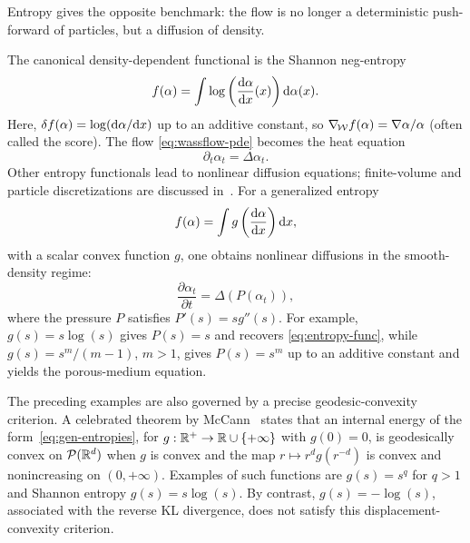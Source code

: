 Entropy gives the opposite benchmark: the flow is no longer a deterministic push-forward of particles, but a diffusion of density.

\begin{example}
The canonical density-dependent functional is the Shannon neg-entropy
   \begin{equation}
       f(\alpha) = \int \log\left(\frac{\mathrm{d} \alpha}{\mathrm{d} x}(x)\right) \mathrm{d} \alpha(x). \label{eq:entropy-func}
   \end{equation}
   Here, $\delta f(\alpha) = \log(\mathrm{d}\alpha/\mathrm{d} x)$ up to an additive constant, so $\nabla_{\!\operatorname{\mathcal{W}}} f(\alpha) = \nabla \alpha/\alpha$ (often called the score). The flow \eqref{eq:wassflow-pde} becomes the heat equation
   \begin{equation*}
       \partial_t \alpha_t = \Delta \alpha_t.
   \end{equation*}
   Other entropy functionals lead to nonlinear diffusion equations; finite-volume and particle discretizations are discussed in~\cite{CarrilloFiniteVolume,GianazzaARMA,Maas2011,ErbarHeatManifold}.
%
For a generalized entropy
   \begin{equation}\label{eq:gen-entropies}
       f(\alpha) = \int g\left(\frac{\mathrm{d} \alpha}{\mathrm{d} x}\right) \mathrm{d} x,
   \end{equation}
	   with a scalar convex function $g$, one obtains nonlinear diffusions in the smooth-density regime:
   \begin{equation*}
       \frac{\partial \alpha_t}{\partial t} = \Delta(P(\alpha_t)),
   \end{equation*}
   where the pressure $P$ satisfies $P'(s)=s g''(s)$. For example, $g(s) = s \log(s)$ gives $P(s)=s$ and recovers \eqref{eq:entropy-func}, while $g(s) = s^m/(m-1)$, $m > 1$, gives $P(s)=s^m$ up to an additive constant and yields the porous-medium equation.
\end{example}
The preceding examples are also governed by a precise geodesic-convexity criterion.
	A celebrated theorem by McCann~\cite{mccann1997convexity} states that an internal energy of the form~\eqref{eq:gen-entropies}, for $g : \mathbb{R}^+ \to \mathbb{R}\cup\{+\infty\}$ with $g(0)=0$, is geodesically convex on $\mathcal{P}(\mathbb{R}^d)$ when $g$ is convex and the map $r \mapsto r^d g(r^{-d})$ is convex and nonincreasing on $(0,+\infty)$.
	Examples of such functions are $g(s)=s^q$ for $q>1$ and Shannon entropy $g(s)=s \log(s)$. %
	By contrast, $g(s)=-\log(s)$, associated with the reverse KL divergence, does not satisfy this displacement-convexity criterion.

